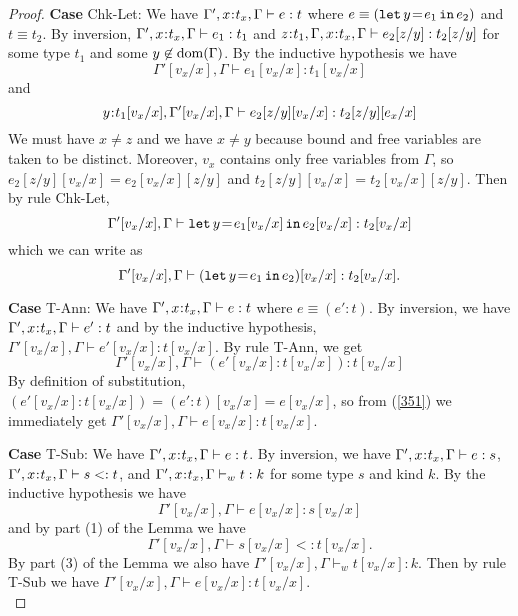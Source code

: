 \documentclass[11pt]{article}
\newcommand{\bind}{\hspace{0.05em}{:}\hspace{0.05em}} %
\newcommand{\letin}[3]{{\tt let}\,#1\hspace{0.1em}{=}\hspace{0.1em}#2\,{\tt in}\,#3}
\newcommand{\dom}[1]{{\rm dom}(#1)}
\begin{document}
\begin{proof}
{\bf Case} {\sc Chk-Let}: We have $\Gamma', x\bind t_x,\Gamma \vdash e : t$ where $e \equiv (\letin{y}{e_1}{e_2})$ and $t \equiv t_2$. By inversion, $\Gamma', x\bind t_x,\Gamma \vdash e_1 : t_1$ and $z\bind t_1, \Gamma,x\bind t_x,\Gamma \vdash e_2[z/y] : t_2[z/y]$ for some type $t_1$ and some $y\not\in\dom{\Gamma}$. By the inductive hypothesis we have
\begin{equation}
\Gamma'[v_x/x],\Gamma \vdash e_1[v_x/x] : t_1[v_x/x]
\end{equation} and
\begin{equation}
y\bind t_1[v_x/x], \Gamma'[v_x/x], \Gamma \vdash e_2[z/y][v_x/x] : t_2[z/y][e_x/x]
\end{equation}
We must have $x\neq z$ and we have $x \neq y$ because bound and free variables are taken to be distinct. Moreover, $v_x$ contains only free variables from $\Gamma$, so $e_2[z/y][v_x/x] = e_2[v_x/x][z/y]$ and $t_2[z/y][v_x/x] = t_2[v_x/x][z/y]$. Then by rule {\sc Chk-Let},
\begin{equation}
\Gamma'[v_x/x], \Gamma \vdash \letin{y}{e_1[v_x/x]}{e_2[v_x/x]} : t_2[v_x/x]
\end{equation} which we can write as \[
\Gamma'[v_x/x], \Gamma \vdash (\letin{y}{e_1}{e_2})[v_x/x]:t_2[v_x/x].
\] 

{\bf Case} {\sc T-Ann}: We have $\Gamma', x\bind t_x,\Gamma \vdash e : t$ where $e \equiv (e':t)$. By inversion, we have $\Gamma', x\bind t_x,\Gamma \vdash e' : t$ and by the inductive hypothesis, $\Gamma'[v_x/x],\Gamma \vdash e'[v_x/x] : t[v_x/x]$. By rule {\sc T-Ann}, we get
\begin{equation}\label{351}
\Gamma'[v_x/x], \Gamma \vdash (e'[v_x/x] : t[v_x/x]) : t[v_x/x]
\end{equation}
By definition of substitution, $(e'[v_x/x] : t[v_x/x]) = (e':t)[v_x/x] = e[v_x/x]$, so from (\ref{351}) we immediately get $\Gamma'[v_x/x], \Gamma \vdash e[v_x/x] : t[v_x/x]$.

{\bf Case} {\sc T-Sub}: We have $\Gamma', x\bind t_x,\Gamma \vdash e : t$. By inversion, we have $\Gamma',x\bind t_x,\Gamma \vdash e : s$,\; $\Gamma', x\bind t_x, \Gamma \vdash s <: t$, and $\Gamma',x\bind t_x,\Gamma \vdash_w t : k$ for some type $s$ and kind $k$. By the inductive hypothesis we have
\begin{equation} \label{371}
\Gamma'[v_x/x], \Gamma \vdash e[v_x/x] : s[v_x/x]
\end{equation}
and by part (1) of the Lemma we have
\begin{equation} \label{372}
\Gamma'[v_x/x],\Gamma \vdash s[v_x/x] <: t[v_x/x].
\end{equation}
By part (3) of the Lemma we also have $\Gamma'[v_x/x],\Gamma \vdash_w t[v_x/x] : k$. Then by rule {\sc T-Sub} we have $\Gamma'[v_x/x], \Gamma \vdash e[v_x/x] : t[v_x/x]$. \\


\end{proof}
\end{document}

